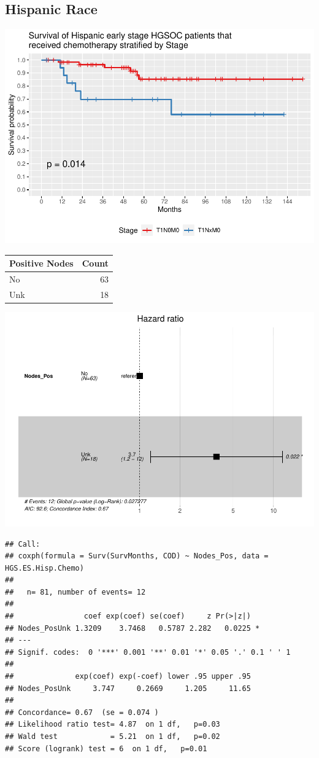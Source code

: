 \documentclass[
]{article}
\begin{document}
\hypertarget{hispanic-race}{%
\subsection{Hispanic Race}\label{hispanic-race}}

\includegraphics{EarlyOvaryRace_files/figure-latex/unnamed-chunk-12-1.pdf}

\begin{tabular}[t]{l|r}
\hline
Positive Nodes & Count\\
\hline
No & 63\\
\hline
Unk & 18\\
\hline
\end{tabular}

\includegraphics{EarlyOvaryRace_files/figure-latex/unnamed-chunk-13-1.pdf}

\begin{verbatim}
## Call:
## coxph(formula = Surv(SurvMonths, COD) ~ Nodes_Pos, data = HGS.ES.Hisp.Chemo)
## 
##   n= 81, number of events= 12 
## 
##                coef exp(coef) se(coef)     z Pr(>|z|)  
## Nodes_PosUnk 1.3209    3.7468   0.5787 2.282   0.0225 *
## ---
## Signif. codes:  0 '***' 0.001 '**' 0.01 '*' 0.05 '.' 0.1 ' ' 1
## 
##              exp(coef) exp(-coef) lower .95 upper .95
## Nodes_PosUnk     3.747     0.2669     1.205     11.65
## 
## Concordance= 0.67  (se = 0.074 )
## Likelihood ratio test= 4.87  on 1 df,   p=0.03
## Wald test            = 5.21  on 1 df,   p=0.02
## Score (logrank) test = 6  on 1 df,   p=0.01
\end{verbatim}
\end{document}
